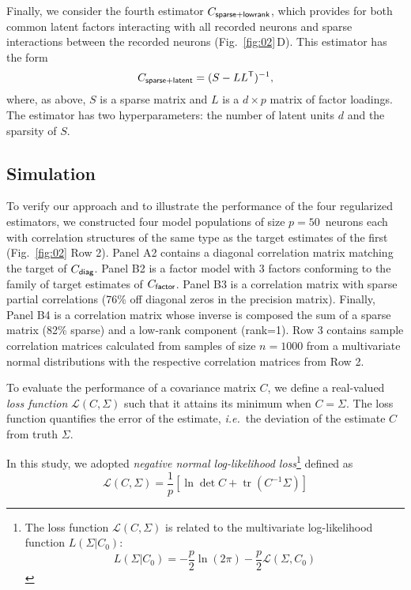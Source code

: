 \documentclass[10pt]{article}
\DeclareMathOperator{\Tr}{tr}
\newcommand{\loss}[1]{\mathcal L\left(#1\right)}
\newcommand{\T}{{\sf T}}
\begin{document}
Finally, we consider the fourth estimator $C_{\sf sparse+lowrank}$, which provides for both common latent factors interacting with all recorded neurons and sparse interactions between the recorded neurons (Fig.~\ref{fig:02}\,D). This estimator has the form
\begin{equation}
C_{\sf sparse+latent} = (S - LL^\T)^{-1},
\end{equation}
where, as above, $S$ is a sparse matrix and $L$ is a $d\times p$ matrix of factor loadings. The estimator has two hyperparameters: the number of latent units $d$ and the sparsity of $S$.

\subsection*{Simulation}
To verify our approach and to illustrate the performance of the four regularized estimators, we constructed four model populations of size $p=50$~neurons each with correlation structures of the same type as the target estimates of the first (Fig.~\ref{fig:02} Row 2). Panel A2 contains a diagonal correlation matrix matching the target of $C_{\sf diag}$. Panel B2 is a factor model with 3 factors conforming to the family of target estimates of $C_{\sf factor}$. Panel B3 is a correlation matrix with sparse partial correlations (76\% off diagonal zeros in the precision matrix). Finally, Panel B4 is a correlation matrix whose inverse is composed the sum of a sparse matrix (82\% sparse) and a low-rank component (rank=1).
Row 3 contains sample correlation matrices calculated from samples of size $n=1000$ from a multivariate normal distributions with the respective correlation matrices from Row 2.

To evaluate the performance of a covariance matrix $C$, we define a real-valued \emph{loss function} $\loss{C,\Sigma}$ such that it attains its minimum when $C=\Sigma$.  The loss function quantifies the error of the estimate, \emph{i.e.}~the deviation of the estimate $C$ from truth $\Sigma$.

In this study, we adopted \emph{negative normal log-likelihood loss}\footnote{
The loss function $\loss{C,\Sigma}$ is related to the multivariate log-likelihood function $L(\Sigma|C_0)$: 
\begin{equation*}
    L(\Sigma|C_0) = -\frac p 2 \ln(2\pi) -\frac p 2 \loss{\Sigma,C_0}
\end{equation*}
}
defined as
\begin{equation}\label{eq:loss}
    \loss{C,\Sigma} = \frac 1 p\left[\ln \det C + \Tr(C^{-1}\Sigma)\right]
\end{equation}
\end{document}
